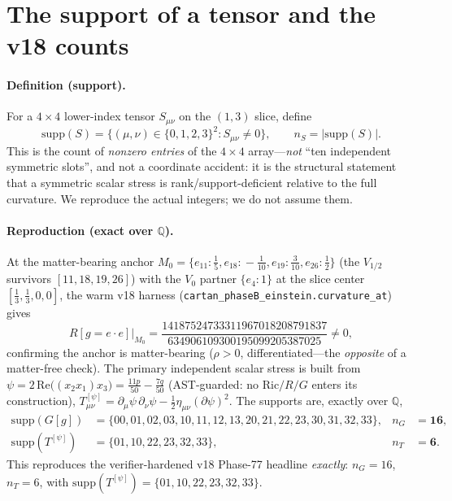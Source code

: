 \documentclass[11pt]{article}
\newcommand{\QQ}{\mathbb{Q}}
\newcommand{\supp}{\mathrm{supp}}
\newcommand{\eu}{e}
\begin{document}
\section{The support of a tensor and the v18 counts}\label{sec:support}

\paragraph{Definition (support).} For a $4\times4$ lower-index tensor $S_{\mu\nu}$ on the
$(1,3)$ slice, define
\begin{equation}\label{eq:supp-def}
\supp(S)=\{(\mu,\nu)\in\{0,1,2,3\}^2 : S_{\mu\nu}\neq0\},\qquad n_S=|\supp(S)|.
\end{equation}
This is the count of \emph{nonzero entries} of the $4\times4$ array---\emph{not} ``ten
independent symmetric slots'', and not a coordinate accident: it is the structural statement
that a symmetric scalar stress is rank/support-deficient relative to the full curvature. We
reproduce the actual integers; we do not assume them.

\paragraph{Reproduction (exact over $\QQ$).} At the matter-bearing anchor $M_0=\{e_{11}\!:\!
\tfrac15, e_{18}\!:\!-\tfrac1{10}, e_{19}\!:\!\tfrac3{10}, e_{26}\!:\!\tfrac12\}$ (the
$V_{1/2}$ survivors $[11,18,19,26]$) with the $V_0$ partner $\{e_4\!:\!1\}$ at the slice
center $[\tfrac13,\tfrac13,0,0]$, the warm v18 harness
(\texttt{cartan\_phaseB\_einstein.curvature\_at}) gives
\begin{equation}\label{eq:R-nonzero}
R[g=\eu\!\cdot\!\eu]\big|_{M_0}=\frac{14187524733311967018208791837}{634906109300195099205387025}\neq0,
\end{equation}
confirming the anchor is matter-bearing ($\rho>0$, differentiated---the \emph{opposite} of a
matter-free check). The primary independent scalar stress is built from
$\psi=2\,\mathrm{Re}\big((x_2x_1)x_3\big)=\tfrac{11p}{50}-\tfrac{7q}{50}$ (AST-guarded: no
$\mathrm{Ric}/R/G$ enters its construction), $T^{[\psi]}_{\mu\nu}=\partial_\mu\psi\,\partial_\nu
\psi-\tfrac12\eta_{\mu\nu}(\partial\psi)^2$. The supports are, exactly over $\QQ$,
\begin{align}
\supp(G[g])&=\{00,01,02,03,10,11,12,13,20,21,22,23,30,31,32,33\}, & n_G&=\mathbf{16},
\label{eq:nG}\\
\supp(T^{[\psi]})&=\{01,10,22,23,32,33\}, & n_T&=\mathbf{6}.
\label{eq:nT}
\end{align}
This reproduces the verifier-hardened v18 Phase-77 headline \emph{exactly}: $n_G=16$, $n_T=6$,
with $\supp(T^{[\psi]})=\{01,10,22,23,32,33\}$.
\end{document}
